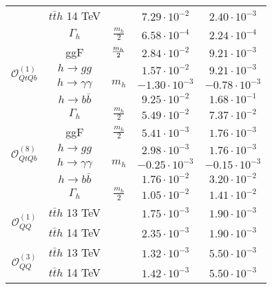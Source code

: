 \begin{table}[t!]
{\begin{tabular}{c||cccc}
            	                                                   	&   $t\bar t h$  {\color{Mahogany}  14 TeV }& & $7.29\cdot 10^{-2}$&  $2.40\cdot 10^{-3}$\\	           
            	                                                   &  $\Gamma_h$  & $\frac{m_h}{ 2}$ & $6.58 \cdot 10^{-4}$ &  $2.24 \cdot 10^{-4}$ \\   
                       	                                                   	\midrule
           \multirow{4}{*}{ { \normalsize$\mathcal{O}_{QtQb}^{(1)}$} } & ggF& ${m_h\over 2}$&$2.84\cdot 10^{-2}$&$9.21\cdot 10^{-3}$\\   %
            &  $h \to gg$& \multirow{3}{*}{$m_h$}&$ 1.57\cdot 10^{-2}$&$ 9.21\cdot 10^{-3}$\\
           &  $h \to \gamma \gamma$& &$-1.30\cdot 10^{-3}$&$-0.78\cdot 10^{-3}$\\
           &  $h \to b \bar b$& &$9.25\cdot 10^{-2}$&$1.68\cdot 10^{-1}$\\
           &  $\Gamma_h$  & $\frac{m_h}{ 2}$ & $5.49 \cdot 10^{-2}$ &  $7.37 \cdot 10^{-2}$ \\   
			\midrule
			 \multirow{4}{*}{{ \normalsize$\mathcal{O}_{QtQb}^{(8)}$}}  & ggF& {$\frac{m_h}{ 2}$}&$5.41\cdot 10^{-3}$&$1.76\cdot 10^{-3}$\\      %
			 & $h \to gg$& \multirow{3}{*}{$m_h$}&$2.98\cdot 10^{-3}$&$1.76\cdot 10^{-3}$\\
			&  $h \to \gamma \gamma$& &$-0.25\cdot 10^{-3}$& $-0.15\cdot 10^{-3}$\\
			&  $h \to b \bar b$& &$1.76\cdot 10^{-2}$&$3.20\cdot 10^{-2}$\\
			  &  $\Gamma_h$  & $\frac{m_h}{ 2}$ & $1.05 \cdot 10^{-2}$ &  $1.41 \cdot 10^{-2}$ \\   
			\midrule	    	 
			 \multirow{2}{*}{{ \normalsize$\mathcal{O}_{QQ}^{(1)}$}  }
			 	&  $t\bar t h$ {\color{Mahogany}  13 TeV }& \mr{$m_t+\frac{m_h}{ 2}$}&  {$1.75\cdot 10^{-3}$} &$1.90\cdot 10^{-3}$\\	    
			 &   $t\bar t h$  {\color{Mahogany}  14 TeV }& & $2.35\cdot 10^{-3}$& $1.90\cdot 10^{-3}$\\          
			 \midrule	    	 
			 \multirow{2}{*}{{ \normalsize$\mathcal{O}_{QQ}^{(3)}$}  }
			 &  $t\bar t h$ {\color{Mahogany}  13 TeV }& \mr{$m_t+\frac{m_h}{ 2}$}&  {$1.32\cdot 10^{-3}$} & $5.50\cdot 10^{-3}$\\	    
			 &   $t\bar t h$  {\color{Mahogany}  14 TeV }& & $1.42\cdot 10^{-3}$& $5.50\cdot 10^{-3}$\\        

\end{tabular}}
\end{table}
